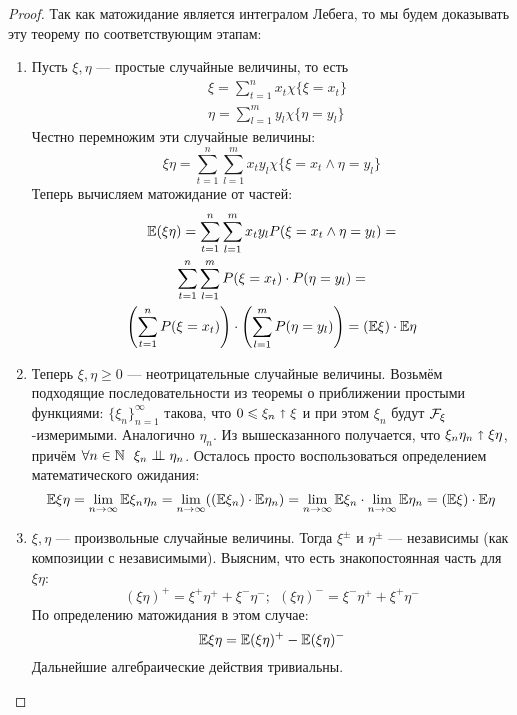 \begin{proof}
	Так как матожидание является интегралом Лебега, то мы будем доказывать эту теорему по соответствующим этапам:
	\begin{enumerate}
		\item Пусть $\xi, \eta$ --- простые случайные величины, то есть
		\begin{align*}
			&{\xi = \sum_{t = 1}^n x_t \chi\{\xi = x_t\}}
			\\
			&{\eta = \sum_{l = 1}^m y_l \chi\{\eta = y_l\}}
		\end{align*}
		Честно перемножим эти случайные величины:
		\[
			\xi\eta = \sum_{t = 1}^n \sum_{l = 1}^m x_t y_l \chi\{\xi = x_t \wedge \eta = y_l\}
		\]
		Теперь вычисляем матожидание от частей:
		\begin{multline*}
			\mathbb{E}(\xi\eta) = \sum_{t = 1}^n \sum_{l = 1}^m x_t y_l P(\xi = x_t \wedge \eta = y_l) =
			\\
			\sum_{t = 1}^n \sum_{l = 1}^m P(\xi = x_t) \cdot P(\eta = y_l) =
			\\
			\left(\sum_{t = 1}^n P(\xi = x_t)\right) \cdot \left(\sum_{l = 1}^m P(\eta = y_l)\right) = (\mathbb{E}\xi) \cdot \mathbb{E}\eta
		\end{multline*}
		
		\item Теперь $\xi, \eta \ge 0$ --- неотрицательные случайные величины. Возьмём подходящие последовательности из теоремы о приближении простыми функциями: $\{\xi_n\}_{n = 1}^\infty$ такова, что $0 \leqslant \xi_n \shortuparrow \xi$ и при этом $\xi_n$ будут $\mathcal{F}_\xi$-измеримыми. Аналогично $\eta_n$. Из вышесказанного получается, что $\xi_n\eta_n \shortuparrow \xi\eta$, причём $\forall n \in \mathbb{N}\ \ \xi_n \perp\mkern-9.5mu\perp \eta_n$. Осталось просто воспользоваться определением математического ожидания:
		\[
			\mathbb{E}\xi\eta = \lim_{n \to \infty} \mathbb{E}\xi_n\eta_n = \lim_{n \to \infty} ((\mathbb{E}\xi_n) \cdot \mathbb{E}\eta_n) = \lim_{n \to \infty} \mathbb{E}\xi_n \cdot \lim_{n \to \infty} \mathbb{E}\eta_n = (\mathbb{E}\xi) \cdot \mathbb{E}\eta
		\]
		
		\item $\xi, \eta$ --- произвольные случайные величины. Тогда $\xi^{\pm}$ и $\eta^{\pm}$ --- независимы (как композиции с независимыми). Выясним, что есть знакопостоянная часть для $\xi\eta$:
		\[
			(\xi\eta)^+ = \xi^+ \eta^+ + \xi^-\eta^-;\ \ (\xi\eta)^- = \xi^-\eta^+ + \xi^+\eta^-
		\]
		По определению матожидания в этом случае:
		\[
			\mathbb{E}\xi\eta = \mathbb{E}(\xi\eta)^+ - \mathbb{E}(\xi\eta)^-
		\]
		Дальнейшие алгебраические действия тривиальны.
	\end{enumerate}
\end{proof}

